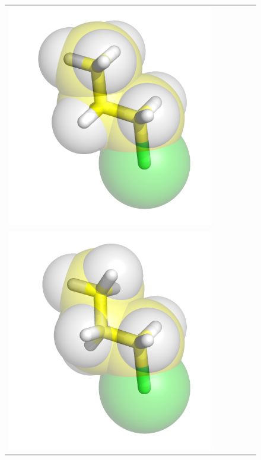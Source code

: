 \documentclass{svmult}
\begin{document}
\begin{figure}
\begin{tabular}{cccccc}
\includegraphics[width=\tmpa]{fig/m003-005} \\
\includegraphics[width=\tmpa]{fig/m003-006} &

\end{tabular}
\end{figure}
\end{document}
